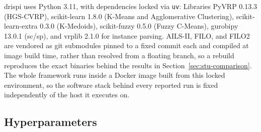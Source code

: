 \gls{drispi} uses Python 3.11, with dependencies locked via \texttt{uv}: Libraries PyVRP 0.13.3 (HGS-CVRP), scikit-learn 1.8.0 (K-Means and Agglomerative Clustering), scikit-learn-extra 0.3.0 (K-Medoids), scikit-fuzzy 0.5.0 (Fuzzy C-Means), gurobipy 13.0.1 (\gls{sc}/\gls{sp}), and vrplib 2.1.0 for instance parsing. AILS-II, FILO, and FILO2 are vendored as git submodules pinned to a fixed commit each and compiled at image build time, rather than resolved from a floating branch, so a rebuild reproduces the exact binaries behind the results in Section~\ref{sec:stu-comparison}. The whole framework runs inside a Docker image built from this locked environment, so the software stack behind every reported run is fixed independently of the host it executes on.

\subsection{Hyperparameters}\label{sec:stu-hyperparameters}
